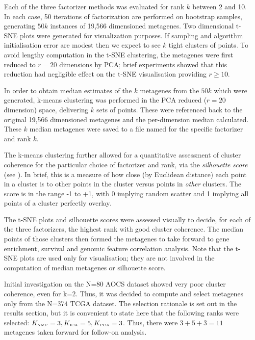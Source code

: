 \documentclass[tikz, 11pt,a4paper,oneside,fleqn]{article}
\begin{document}
Each of the three factorizer methods was evaluated for rank $k$ between 2 and 10.  In each case, 50 iterations of factorization are performed on bootstrap samples, generating $50 k$ instances of 19,566 dimensioned metagenes.  Two dimensional t-SNE plots were generated for visualization purposes.   If sampling and algorithm initialisation error are modest then we expect to see $k$ tight clusters of points.   To avoid lengthy computation in the t-SNE clustering, the metagenes were first reduced to $r=20$ dimensions by PCA; brief experiments showed that this reduction had negligible effect on the t-SNE visualisation providing $r \geq 10$.   

In order to obtain median estimates of the $k$ metagenes from the $50 k$ which were generated, k-means clustering was performed in the PCA reduced ($r=20$ dimension) space, delivering $k$ sets of points.  These were referenced back to the original 19,566 dimensioned metagenes and the per-dimension median calculated.  These $k$ median metagenes were saved to a file named for the specific factorizer and rank $k$.  

The k-means clustering further allowed for a quantitative assessment of cluster coherence for the particular choice of factorizer and rank, via the \emph{silhouette score} (see \cite{Wikipedia}).  In brief, this is a measure of how close (by Euclidean distance) each point in a cluster is to other points in the cluster versus points in \emph{other} clusters.  
The score is in the range -1 to +1, with 0 implying random scatter and 1 implying all points of a cluster perfectly overlay.

The t-SNE plots and silhouette scores were assessed visually to decide, for each of the three factorizers, the highest rank with good cluster coherence.  The median points of those clusters then formed the metagenes to take forward to gene enrichment, survival and genomic feature correlation analysis.   
Note that the t-SNE plots are used only for visualisation; they are not involved in the computation of median metagenes or silhouette score.

Initial investigation on the N=80 AOCS dataset showed very poor cluster coherence, even for k=2.   Thus, it was decided to compute and select metagenes only from the N=374 TCGA dataset.   
The selection rationale is set out in the results section, but it is convenient to state here that the following ranks were selected:
$K_{\mbox{\tiny NMF}} = 3, K_{\mbox{\tiny ICA}} = 5, K_{\mbox{\tiny PCA}} =3$.  Thus, there were $3 + 5 + 3 = 11$ metagenes taken forward for follow-on analysis.
\end{document}
